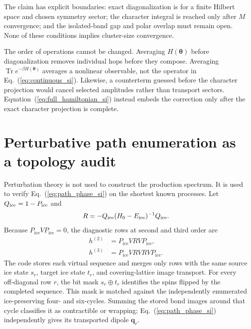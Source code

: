 \documentclass[aps,prl,onecolumn,amsmath,amssymb]{revtex4-2}
\newcommand{\bq}{\bm q}
\newcommand{\btheta}{\bm\theta}
\newcommand{\Pice}{P_{\mathrm{ice}}}
\begin{document}
The claim has explicit boundaries: exact diagonalization is for a finite
Hilbert space and chosen symmetry sector; the character integral is reached
only after $M$ convergence; and the isolated-band gap and polar overlap must
remain open.  None of these conditions implies cluster-size convergence.

The order of operations cannot be changed.  Averaging $H(\btheta)$ before
diagonalization removes individual hops before they compose.  Averaging
$\operatorname{Tr}e^{-\beta H(\btheta)}$ averages a nonlinear observable,
not the operator in Eq.~(\ref{eq:continuous_si}).  Likewise, a counterterm
guessed before the character projection would cancel selected amplitudes
rather than transport sectors.  Equation~(\ref{eq:full_hamiltonian_si}) instead
embeds the correction only after the exact character projection is complete.

\section{Perturbative path enumeration as a topology audit}

Perturbation theory is not used to construct the production spectrum.  It is
used to verify Eq.~(\ref{eq:path_phase_si}) on the shortest known processes.
Let $Q_{\rm ice}=1-\Pice$ and
\begin{equation}
 R=-Q_{\rm ice}(H_0-E_{\rm ice})^{-1}Q_{\rm ice}.
\end{equation}
Because $\Pice V\Pice=0$, the diagnostic rows at second and third order are
\begin{align}
 h^{(2)}&=\Pice VRV\Pice,\\
 h^{(3)}&=\Pice VRVRV\Pice.
\end{align}
The code stores each virtual sequence and merges only rows with the same source
ice state $s_r$, target ice state $t_r$, and covering-lattice image transport.
For every off-diagonal row $r$, the bit mask $s_r\mathbin\oplus t_r$ identifies
the spins flipped by the completed sequence.  This mask is matched against the
independently enumerated ice-preserving four- and six-cycles.  Summing the
stored bond images around that cycle classifies it as contractible or wrapping;
Eq.~(\ref{eq:path_phase_si}) independently gives its transported dipole
$\bq_r$.
\end{document}
